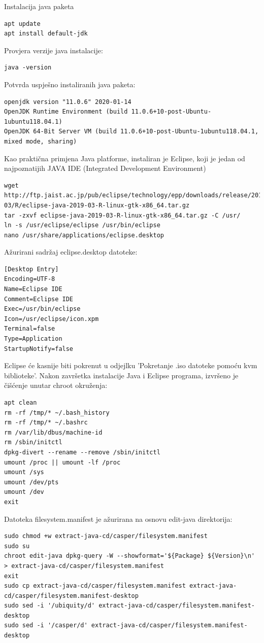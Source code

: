 \documentclass[12pt,vi]{mitthesis}
\begin{document}
\noindent
Instalacija java paketa\cite{apt-java-ubuntu-install}\cite{java-ubuntu-install}
\begin{lstlisting}[style=BashInputStyle]
apt update
apt install default-jdk
\end{lstlisting}
Provjera verzije java instalacije:
\begin{lstlisting}[style=BashInputStyle]
java -version
\end{lstlisting}
Potvrda uspješno instaliranih java paketa:
\begin{lstlisting}[style=BashInputStyle]
openjdk version "11.0.6" 2020-01-14
OpenJDK Runtime Environment (build 11.0.6+10-post-Ubuntu-1ubuntu118.04.1)
OpenJDK 64-Bit Server VM (build 11.0.6+10-post-Ubuntu-1ubuntu118.04.1, mixed mode, sharing)
\end{lstlisting}
Kao praktična primjena Java platforme, instaliran je Eclipse, koji je jedan od najpoznatijih JAVA IDE (Integrated Development Environment)\cite{eclipse-ubuntu-install}
\begin{lstlisting}[style=BashInputStyle]
wget http://ftp.jaist.ac.jp/pub/eclipse/technology/epp/downloads/release/2019-03/R/eclipse-java-2019-03-R-linux-gtk-x86_64.tar.gz
tar -zxvf eclipse-java-2019-03-R-linux-gtk-x86_64.tar.gz -C /usr/
ln -s /usr/eclipse/eclipse /usr/bin/eclipse
nano /usr/share/applications/eclipse.desktop
\end{lstlisting}
Ažurirani sadržaj eclipse.desktop datoteke:
\begin{lstlisting}[style=BashInputStyle]
[Desktop Entry]
Encoding=UTF-8
Name=Eclipse IDE
Comment=Eclipse IDE
Exec=/usr/bin/eclipse
Icon=/usr/eclipse/icon.xpm
Terminal=false
Type=Application
StartupNotify=false
\end{lstlisting}
Eclipse će kasnije biti pokrenut u odjejlku 'Pokretanje .iso datoteke pomoću kvm biblioteke'.
\noindent
Nakon završetka instalacije Java i Eclipse programa, izvršeno je čišćenje unutar chroot okruženja:
\begin{lstlisting}[style=BashInputStyle]
apt clean
rm -rf /tmp/* ~/.bash_history
rm -rf /tmp/* ~/.bashrc
rm /var/lib/dbus/machine-id
rm /sbin/initctl
dpkg-divert --rename --remove /sbin/initctl
umount /proc || umount -lf /proc
umount /sys
umount /dev/pts
umount /dev
exit
\end{lstlisting}

\noindent
Datoteka filesystem.manifest je ažurirana na osnovu edit-java direktorija:
\begin{lstlisting}[style=BashInputStyle]
sudo chmod +w extract-java-cd/casper/filesystem.manifest
sudo su
chroot edit-java dpkg-query -W --showformat='${Package} ${Version}\n' > extract-java-cd/casper/filesystem.manifest
exit
sudo cp extract-java-cd/casper/filesystem.manifest extract-java-cd/casper/filesystem.manifest-desktop
sudo sed -i '/ubiquity/d' extract-java-cd/casper/filesystem.manifest-desktop
sudo sed -i '/casper/d' extract-java-cd/casper/filesystem.manifest-desktop
\end{lstlisting}
\end{document}
